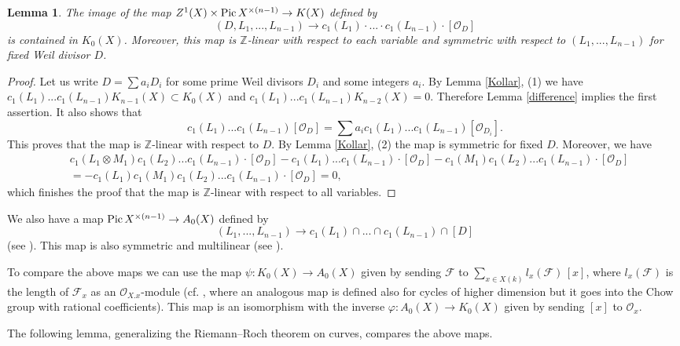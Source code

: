 \documentclass[twoside, 11pt]{article}
\theoremstyle{plain}
\newtheorem{Lemma}[Thm]{\sc Lemma}
\theoremstyle{definition}
\theoremstyle{remark}
\newcommand{\ZZ}{{\mathbb Z}}
\newcommand{\cF}{{\mathcal F}}
\newcommand{\cO}{{\mathcal O}}
\newcommand{\Pic}{{\mathop{\rm Pic \, }}}
\begin{document}
\begin{Lemma}\label{intersection-with-Weil-div}
 The image of the map $Z^1(X)\times \Pic X ^{\times (n-1)}\to K(X)$ defined by 
$$(D, L_1,..., L_{n-1})\to  
c_1(L_1)\cdot ...\cdot c_1(L_{n-1}) \cdot [\cO_D]$$
is contained in $K_0(X)$. Moreover, this map is $\ZZ$-linear with respect to each variable and
symmetric with respect to $(L_1,..., L_{n-1})$  for fixed Weil divisor $D$.
\end{Lemma}

\begin{proof}
Let us  write  $D=\sum a_iD_i$ for some  prime Weil divisors $D_i$ and some integers $a_i$. 
 By Lemma \ref{Kollar}, (1) we have 
$c_1(L_1)...c_1(L_{n-1}) K_{n-1}(X)\subset K_0(X)$ and $c_1(L_1)...c_1(L_{n-1}) K_{n-2}(X)=0$. Therefore Lemma 
\ref{difference} implies the first assertion. It also shows that
$$c_1(L_1)...c_1(L_{n-1})[\cO_D]= \sum a_i 
c_1(L_1)...c_1(L_{n-1})[\cO_{D_i}].
$$
This proves that the map is $\ZZ$-linear with respect to $D$.
By Lemma \ref{Kollar}, (2) the map is symmetric for fixed $D$. Moreover,  we have
\begin{align*}
&c_1(L_1\otimes M_1)c_1(L_2)...c_1(L_{n-1}) \cdot [\cO_D]-c_1(L_1)...c_1(L_{n-1}) \cdot [\cO_D]-c_1(M_1)c_1(L_2)...c_1(L_{n-1}) \cdot [\cO_D]\\
&=-c_1(L_1)c_1(M_1)c_1(L_2)...c_1(L_{n-1}) \cdot [\cO_D]=0,
\end{align*} 
which finishes the proof that the map is $\ZZ$-linear with respect to all variables.
\end{proof}

\medskip

We  also have  a map $\Pic X ^{\times (n-1)}\to A_0(X)$ defined by 
$$(L_1,..., L_{n-1})\to  
c_1(L_1)\cap ...\cap c_1(L_{n-1}) \cap [D]$$
(see \cite[Section 2.5]{Fu}). This map is also symmetric and multilinear (see \cite[Proposition 2.5]{Fu}).

To compare the above maps we can use the map $\psi: K_0(X)\to A_0(X)$ given by sending $\cF$ to $\sum _{x\in X(k)} l_x(\cF)\, [x]$, where $l_x (\cF)$
is the length of $\cF_x$ as an $\cO_{X.x}$-module (cf. \cite[Example 18.3.11]{Fu}, where an analogous map is defined also for cycles of higher dimension but it goes into the Chow group with rational coefficients). This map is an isomorphism with the inverse
$\varphi: A_0(X)\to K_0(X)$ given by sending $[x]$ to $\cO_ x$.

\medskip

The following lemma, generalizing the Riemann--Roch theorem on curves, compares the above maps.
\end{document}
